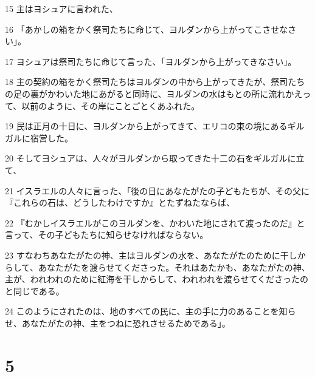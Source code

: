 \par 15 主はヨシュアに言われた、
\par 16 「あかしの箱をかく祭司たちに命じて、ヨルダンから上がってこさせなさい」。
\par 17 ヨシュアは祭司たちに命じて言った、「ヨルダンから上がってきなさい」。
\par 18 主の契約の箱をかく祭司たちはヨルダンの中から上がってきたが、祭司たちの足の裏がかわいた地にあがると同時に、ヨルダンの水はもとの所に流れかえって、以前のように、その岸にことごとくあふれた。
\par 19 民は正月の十日に、ヨルダンから上がってきて、エリコの東の境にあるギルガルに宿営した。
\par 20 そしてヨシュアは、人々がヨルダンから取ってきた十二の石をギルガルに立て、
\par 21 イスラエルの人々に言った、「後の日にあなたがたの子どもたちが、その父に『これらの石は、どうしたわけですか』とたずねたならば、
\par 22 『むかしイスラエルがこのヨルダンを、かわいた地にされて渡ったのだ』と言って、その子どもたちに知らせなければならない。
\par 23 すなわちあなたがたの神、主はヨルダンの水を、あなたがたのために干しからして、あなたがたを渡らせてくださった。それはあたかも、あなたがたの神、主が、われわれのために紅海を干しからして、われわれを渡らせてくださったのと同じである。
\par 24 このようにされたのは、地のすべての民に、主の手に力のあることを知らせ、あなたがたの神、主をつねに恐れさせるためである」。

\chapter{5}

